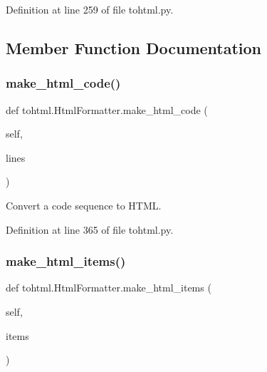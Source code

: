 Definition at line 259 of file tohtml.\+py.



\subsection{Member Function Documentation}
\mbox{\label{classtohtml_1_1_html_formatter_af449a521ac7ae4d1f01b7741d72b8116}} 
\subsubsection{\texorpdfstring{make\+\_\+html\+\_\+code()}{make\_html\_code()}}
{\footnotesize\ttfamily def tohtml.\+Html\+Formatter.\+make\+\_\+html\+\_\+code (\begin{DoxyParamCaption}\item[{}]{self,  }\item[{}]{lines }\end{DoxyParamCaption})}

\begin{DoxyVerb}Convert a code sequence to HTML.\end{DoxyVerb}
 

Definition at line 365 of file tohtml.\+py.

\mbox{\label{classtohtml_1_1_html_formatter_ab39a6e0b6b849637aaea4a4b4ba0f0a6}} 
\subsubsection{\texorpdfstring{make\+\_\+html\+\_\+items()}{make\_html\_items()}}
{\footnotesize\ttfamily def tohtml.\+Html\+Formatter.\+make\+\_\+html\+\_\+items (\begin{DoxyParamCaption}\item[{}]{self,  }\item[{}]{items }\end{DoxyParamCaption})}


